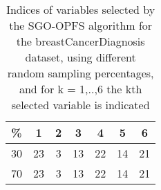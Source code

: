 \begin{table}
	\begin{center}
		\begin{tabular}{c c c c c c c}
			\% & 1 & 2 & 3 & 4 & 5 & 6 \\
			\hline
			30 & 23 & 3 & 13 & 22 & 14 & 21 \\
			70 & 23 & 3 & 13 & 22 & 14 & 21 \\
		\end{tabular}
	\end{center}
	\caption{Indices of variables selected by the SGO-OPFS algorithm for the breastCancerDiagnosis dataset, using different random sampling percentages, and for k = 1,..,6 the kth selected variable is indicated}
\end{table}